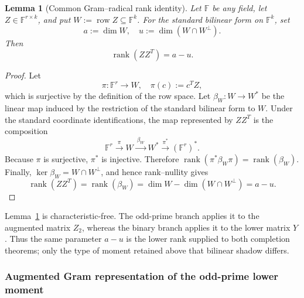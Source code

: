 \documentclass[11pt]{article}
\newcommand{\F}{\mathbb F}
\newcommand{\rank}{\operatorname{rank}}
\newcommand{\1}{\mathbf 1}
\theoremstyle{plain}
\newtheorem{lemma}[theorem]{Lemma}
\theoremstyle{definition}
\theoremstyle{remark}
\begin{document}
\begin{lemma}[Common Gram--radical rank identity]
\label{lem:common-Gram-radical-rank}
Let $\F$ be any field, let $Z\in\F^{r\times k}$, and put
$W:=\operatorname{row}Z\subseteq\F^k$.  For the standard bilinear form on
$\F^k$, set
\begin{equation}
 a:=\dim W,
 \quad
 u:=\dim(W\cap W^\perp).
 \label{eq:common-Gram-radical-parameters}
\end{equation}
Then
\begin{equation}
 \rank(ZZ^T)=a-u.
 \label{eq:common-Gram-radical-rank}
\end{equation}
\end{lemma}
\begin{proof}
Let
\begin{equation}
 \pi:\F^r\longrightarrow W,\quad \pi(c):=c^TZ,
 \label{eq:common-Gram-row-coordinate-surjection}
\end{equation}
which is surjective by the definition of the row space.  Let
$\beta_W:W\to W^*$ be the linear map induced by the restriction of the
standard bilinear form to $W$.  Under the standard coordinate
identifications, the map represented by $ZZ^T$ is the composition
\begin{equation}
 \F^r\xrightarrow{\ \pi\ }W
 \xrightarrow{\ \beta_W\ }W^*
 \xrightarrow{\ \pi^*\ }(\F^r)^*.
 \label{eq:common-Gram-pullback-factorization}
\end{equation}
Because $\pi$ is surjective, $\pi^*$ is injective.  Therefore
$\rank(\pi^*\beta_W\pi)=\rank(\beta_W)$.  Finally,
$\ker\beta_W=W\cap W^\perp$, and hence rank--nullity gives
\begin{equation}
 \rank(ZZ^T)=\rank(\beta_W)
 =\dim W-\dim(W\cap W^\perp)=a-u.
\end{equation}
\end{proof}

Lemma~\ref{lem:common-Gram-radical-rank} is characteristic-free.  The
odd-prime branch applies it to the augmented matrix $Z_2$, whereas the binary
branch applies it to the lower matrix $Y$.  Thus the same parameter $a-u$
is the lower rank supplied to both completion theorems; only the type of
moment retained above that bilinear shadow differs.

\subsubsection{Augmented Gram representation of the odd-prime lower moment}
\label{subsec:odd-augmented-Gram-bridge}
\end{document}
